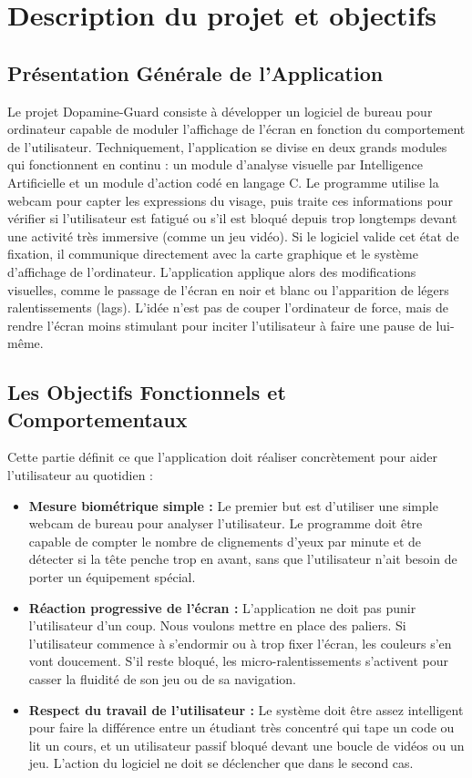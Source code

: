 \documentclass[a4paper, 12pt, twoside]{article}
\begin{document}
\newpage

\section{Description du projet et objectifs}

\subsection{Présentation Générale de l'Application}
Le projet Dopamine-Guard consiste à développer un logiciel de bureau pour ordinateur capable de moduler l'affichage de l'écran en fonction du comportement de l'utilisateur. Techniquement, l'application se divise en deux grands modules qui fonctionnent en continu : un module d'analyse visuelle par Intelligence Artificielle et un module d'action codé en langage C. Le programme utilise la webcam pour capter les expressions du visage, puis traite ces informations pour vérifier si l'utilisateur est fatigué ou s'il est bloqué depuis trop longtemps devant une activité très immersive (comme un jeu vidéo). Si le logiciel valide cet état de fixation, il communique directement avec la carte graphique et le système d'affichage de l'ordinateur. L'application applique alors des modifications visuelles, comme le passage de l'écran en noir et blanc ou l'apparition de légers ralentissements (lags). L'idée n'est pas de couper l'ordinateur de force, mais de rendre l'écran moins stimulant pour inciter l'utilisateur à faire une pause de lui-même.

\subsection{Les Objectifs Fonctionnels et Comportementaux}
Cette partie définit ce que l'application doit réaliser concrètement pour aider l'utilisateur au quotidien :
\begin{itemize}
    \item \textbf{Mesure biométrique simple :} Le premier but est d'utiliser une simple webcam de bureau pour analyser l'utilisateur. Le programme doit être capable de compter le nombre de clignements d'yeux par minute et de détecter si la tête penche trop en avant, sans que l'utilisateur n'ait besoin de porter un équipement spécial.
    \item \textbf{Réaction progressive de l'écran :} L'application ne doit pas punir l'utilisateur d'un coup. Nous voulons mettre en place des paliers. Si l'utilisateur commence à s'endormir ou à trop fixer l'écran, les couleurs s'en vont doucement. S'il reste bloqué, les micro-ralentissements s'activent pour casser la fluidité de son jeu ou de sa navigation.
    \item \textbf{Respect du travail de l'utilisateur :} Le système doit être assez intelligent pour faire la différence entre un étudiant très concentré qui tape un code ou lit un cours, et un utilisateur passif bloqué devant une boucle de vidéos ou un jeu. L'action du logiciel ne doit se déclencher que dans le second cas.
\end{itemize}
\end{document}
